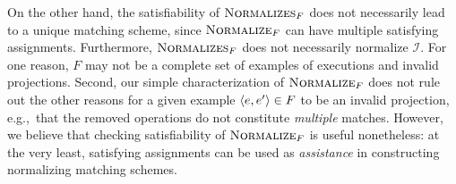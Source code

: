 On the other hand, the satisfiability of $\textsc{Normalizes}_F$ does not
necessarily lead to a unique matching scheme, since $\textsc{Normalize}_F$ can
have multiple satisfying assignments. Furthermore, $\textsc{Normalizes}_F$ does
not necessarily normalize $\mathcal{I}$. For one reason, $F$ may not be a
complete set of examples of executions and invalid projections. Second, our
simple characterization of $\textsc{Normalize}_F$ does not rule out the other
reasons for a given example ${\left\langle{e,e'}\right\rangle} \in F$ to be an invalid projection,
e.g.,~that the removed operations do not constitute \emph{multiple} matches.
However, we believe that checking satisfiability of $\textsc{Normalize}_F$ is
useful nonetheless: at the very least, satisfying assignments can be used as
\emph{assistance} in constructing normalizing matching schemes.
